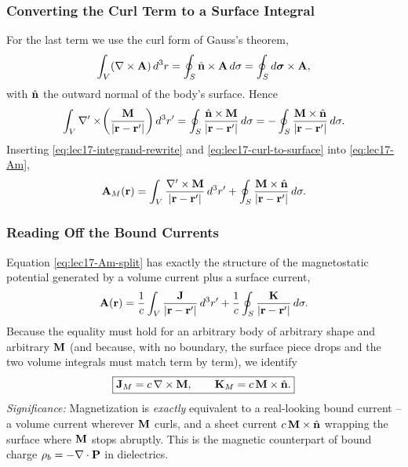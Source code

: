 \subsubsection*{Converting the Curl Term to a Surface Integral}
For the last term we use the curl form of Gauss's theorem,
\begin{equation}\label{eq:lec17-curl-gauss}
  \int_V (\nabla\times\mathbf{A})\,d^3r=\oint_S \hat{\mathbf{n}}\times\mathbf{A}\,d\sigma
  =\oint_S d\boldsymbol{\sigma}\times\mathbf{A},
\end{equation}
with $\hat{\mathbf{n}}$ the outward normal of the body's surface.  Hence
\begin{equation}\label{eq:lec17-curl-to-surface}
  \int_V \nabla'\times\!\left(\frac{\mathbf{M}}{|\mathbf{r}-\mathbf{r}'|}\right)d^3r'
  =\oint_S \frac{\hat{\mathbf{n}}\times\mathbf{M}}{|\mathbf{r}-\mathbf{r}'|}\,d\sigma
  =-\oint_S \frac{\mathbf{M}\times\hat{\mathbf{n}}}{|\mathbf{r}-\mathbf{r}'|}\,d\sigma.
\end{equation}
Inserting \eqref{eq:lec17-integrand-rewrite} and
\eqref{eq:lec17-curl-to-surface} into \eqref{eq:lec17-Am},
\begin{equation}\label{eq:lec17-Am-split}
  \mathbf{A}_M(\mathbf{r})
  =\int_V \frac{\nabla'\times\mathbf{M}}{|\mathbf{r}-\mathbf{r}'|}\,d^3r'
  +\oint_S \frac{\mathbf{M}\times\hat{\mathbf{n}}}{|\mathbf{r}-\mathbf{r}'|}\,d\sigma.
\end{equation}

\subsubsection*{Reading Off the Bound Currents}
Equation \eqref{eq:lec17-Am-split} has exactly the structure of the magnetostatic
potential generated by a volume current plus a surface current,
\begin{equation}\label{eq:lec17-Am-target}
  \mathbf{A}(\mathbf{r})=\frac{1}{c}\int_V \frac{\mathbf{J}}{|\mathbf{r}-\mathbf{r}'|}\,d^3r'
  +\frac{1}{c}\oint_S \frac{\mathbf{K}}{|\mathbf{r}-\mathbf{r}'|}\,d\sigma.
\end{equation}
Because the equality must hold for an arbitrary body of arbitrary shape and arbitrary
$\mathbf{M}$ (and because, with no boundary, the surface piece drops and the two volume
integrals must match term by term), we identify
\begin{equation}\label{eq:lec17-bound-currents}
  \boxed{\mathbf{J}_M=c\,\nabla\times\mathbf{M},
  \qquad
  \mathbf{K}_M=c\,\mathbf{M}\times\hat{\mathbf{n}}.}
\end{equation}
\textit{Significance:} Magnetization is \emph{exactly} equivalent to a real-looking
bound current -- a volume current wherever $\mathbf{M}$ curls, and a sheet current
$c\,\mathbf{M}\times\hat{\mathbf{n}}$ wrapping the surface where $\mathbf{M}$ stops abruptly.  This
is the magnetic counterpart of bound charge $\rho_b=-\nabla\cdot\mathbf{P}$ in dielectrics.

